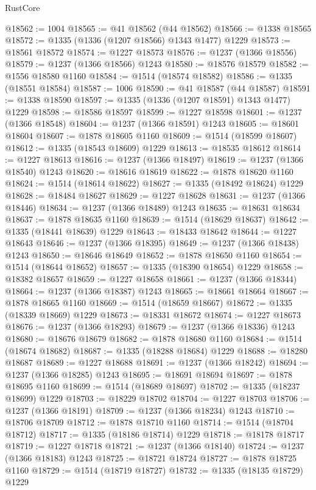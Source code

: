 \begin{lexlean}{RustCore}
\begin{coremodule}
@18562 := 1004
@18565 := @41 @18562 (@44 @18562)
@18566 := @1338 @18565
@18572 := @1335 (@1336 (@1207 @18566) @1343 @1477) @1229
@18573 := @18561 @18572
@18574 := @1227 @18573
@18576 := @1237 (@1366 @18556)
@18579 := @1237 (@1366 @18566) @1243
@18580 := @18576 @18579
@18582 := @1556 @18580 @1160
@18584 := @1514 (@18574 @18582)
@18586 := @1335 (@18551 @18584)
@18587 := 1006
@18590 := @41 @18587 (@44 @18587)
@18591 := @1338 @18590
@18597 := @1335 (@1336 (@1207 @18591) @1343 @1477) @1229
@18598 := @18586 @18597
@18599 := @1227 @18598
@18601 := @1237 (@1366 @18548)
@18604 := @1237 (@1366 @18591) @1243
@18605 := @18601 @18604
@18607 := @1878 @18605 @1160
@18609 := @1514 (@18599 @18607)
@18612 := @1335 (@18543 @18609) @1229
@18613 := @18535 @18612
@18614 := @1227 @18613
@18616 := @1237 (@1366 @18497)
@18619 := @1237 (@1366 @18540) @1243
@18620 := @18616 @18619
@18622 := @1878 @18620 @1160
@18624 := @1514 (@18614 @18622)
@18627 := @1335 (@18492 @18624) @1229
@18628 := @18484 @18627
@18629 := @1227 @18628
@18631 := @1237 (@1366 @18446)
@18634 := @1237 (@1366 @18489) @1243
@18635 := @18631 @18634
@18637 := @1878 @18635 @1160
@18639 := @1514 (@18629 @18637)
@18642 := @1335 (@18441 @18639) @1229
@18643 := @18433 @18642
@18644 := @1227 @18643
@18646 := @1237 (@1366 @18395)
@18649 := @1237 (@1366 @18438) @1243
@18650 := @18646 @18649
@18652 := @1878 @18650 @1160
@18654 := @1514 (@18644 @18652)
@18657 := @1335 (@18390 @18654) @1229
@18658 := @18382 @18657
@18659 := @1227 @18658
@18661 := @1237 (@1366 @18344)
@18664 := @1237 (@1366 @18387) @1243
@18665 := @18661 @18664
@18667 := @1878 @18665 @1160
@18669 := @1514 (@18659 @18667)
@18672 := @1335 (@18339 @18669) @1229
@18673 := @18331 @18672
@18674 := @1227 @18673
@18676 := @1237 (@1366 @18293)
@18679 := @1237 (@1366 @18336) @1243
@18680 := @18676 @18679
@18682 := @1878 @18680 @1160
@18684 := @1514 (@18674 @18682)
@18687 := @1335 (@18288 @18684) @1229
@18688 := @18280 @18687
@18689 := @1227 @18688
@18691 := @1237 (@1366 @18242)
@18694 := @1237 (@1366 @18285) @1243
@18695 := @18691 @18694
@18697 := @1878 @18695 @1160
@18699 := @1514 (@18689 @18697)
@18702 := @1335 (@18237 @18699) @1229
@18703 := @18229 @18702
@18704 := @1227 @18703
@18706 := @1237 (@1366 @18191)
@18709 := @1237 (@1366 @18234) @1243
@18710 := @18706 @18709
@18712 := @1878 @18710 @1160
@18714 := @1514 (@18704 @18712)
@18717 := @1335 (@18186 @18714) @1229
@18718 := @18178 @18717
@18719 := @1227 @18718
@18721 := @1237 (@1366 @18140)
@18724 := @1237 (@1366 @18183) @1243
@18725 := @18721 @18724
@18727 := @1878 @18725 @1160
@18729 := @1514 (@18719 @18727)
@18732 := @1335 (@18135 @18729) @1229

\end{coremodule}
\end{lexlean}
